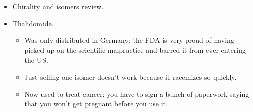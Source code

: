 \documentclass[../notes.tex]{subfiles}
\begin{document}
\begin{itemize}
    \item Chirality and isomers review.
    \item Thalidomide.
    \begin{itemize}
        \item Was only distributed in Germany; the FDA is very proud of having picked up on the scientific malpractice and barred it from ever entering the US.
        \item Just selling one isomer doesn't work because it racemizes so quickly.
        \item Now used to treat cancer; you have to sign a bunch of paperwork saying that you won't get pregnant before you use it.
    \end{itemize}
\end{itemize}
\end{document}
